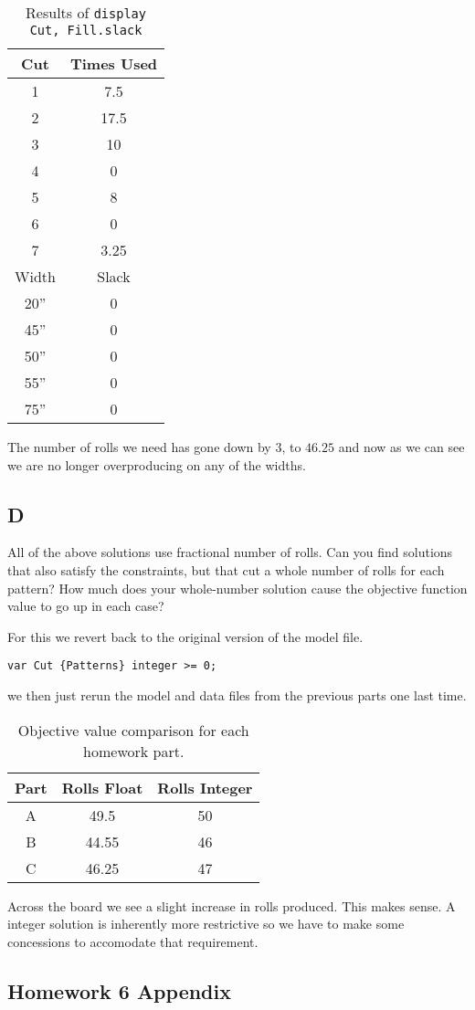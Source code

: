 \begin{table}[!ht]
	\centering
	\begin{tabular}{|c|c|}
		\hline
		Cut & Times Used \\
		\hline
		1 & 7.5 \\
		2 & 17.5 \\
		3 & 10 \\
		4 & 0 \\
		5 & 8 \\
		6 & 0 \\
		7 & 3.25 \\
		\hline
		Width & Slack \\
		\hline 
		20'' & 0 \\
		45'' & 0 \\
		50'' & 0 \\
		55'' & 0 \\
		75'' & 0 \\
		\hline
	\end{tabular}
	\caption{Results of \texttt{display Cut, Fill.slack}}
	\label{tab:<+label+>}
\end{table}

The number of rolls we need has gone down by 3, to $46.25$ and now as we can see we are no longer overproducing on any of the widths. 

\subsection*{D}

\prob

All of the above solutions use fractional number of rolls. Can you find solutions that also satisfy the constraints, but that cut a whole number of rolls for each pattern? How much does your whole-number solution cause the objective function value to go up in each case?

\sol

For this we revert back to the original version of the model file.

\begin{lstlisting}
var Cut {Patterns} integer >= 0;
\end{lstlisting}

we then just rerun the model and data files from the previous parts one last time.

\begin{table}[!ht]
	\centering
	\begin{tabular}{|c|c|c|}
		\hline
		Part & Rolls Float & Rolls Integer \\
		\hline
		A & 49.5 & 50 \\
		B & 44.55 & 46 \\
		C & 46.25 & 47 \\
		\hline
	\end{tabular}
	\caption{Objective value comparison for each homework part.}
	\label{tab:<+label+>}
\end{table}

Across the board we see a slight increase in rolls produced. This makes sense. A integer solution is inherently more restrictive so we have to make some concessions to accomodate that requirement.

\subsection*{Homework 6 Appendix}

